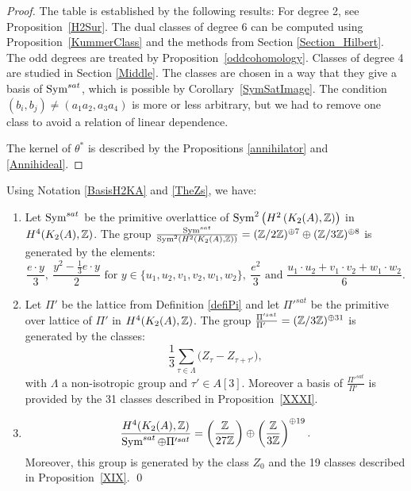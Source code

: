 \begin{proof}
The table is established by the following results:
For degree 2, see Proposition~\ref{H2Sur}. The dual classes of degree 6 can be computed using Proposition~\ref{KummerClass} and the methods from Section \ref{Section_Hilbert}.
The odd degrees are treated by Proposition~\ref{oddcohomology}. Classes of degree 4 are studied in Section \ref{Middle}. The classes are chosen in a way that they give a basis of $\operatorname{Sym}^{sat}$, which is possible by Corollary~\ref{SymSatImage}. The condition $(b_i,b_j)\neq(a_1a_2,a_3a_4)$ is more or less arbitrary, but we had to remove one class to avoid a relation of linear dependence.

The kernel of $\theta^*$ is described by the Propositions \ref{annihilator} and \ref{Annihideal}.
\end{proof}


\begin{thm}\label{integralbasistheorem}
Using Notation \ref{BasisH2KA} and \ref{TheZs}, we have:
\begin{enumerate}
\item
Let $\operatorname{Sym}^{sat}$ be the primitive overlattice of $\operatorname{Sym}^2\left(H^2\left(K_{ 2 }( A ),\mathbb{Z}\right)\right)$ in $H^4(K_2(A),\mathbb{Z})$.
The group $\frac{\operatorname{Sym}^{sat}}{\operatorname{Sym}^2\left(H^2\left(K_{ 2 }( A ),\mathbb{Z}\right)\right)}=(\mathbb{Z}/2\mathbb{Z})^{\oplus 7}\oplus(\mathbb{Z}/3\mathbb{Z})^{\oplus 8}$ is generated by the elements:
$$\frac{e \cdot y}{3},\ \frac{y^2 - \frac{1}{3} e\cdot y}{2} \text{ for } y\in\{u_1,u_2,v_1,v_2,w_1,w_2\},\ 
\frac{e^2}{3} \text{ and } \frac{u_{1}\cdot u_{2}+v_{1}\cdot v_{2}+w_{1}\cdot w_{2}}{6}.$$
\item
Let $\Pi'$ be the lattice from Definition \ref{defiPi} and let $\Pi'^{sat}$ be the primitive over lattice of $\Pi'$ in $H^4(K_2(A),\mathbb{Z})$.
The group $\frac{\Pi'^{sat}}{\Pi'\ \ \ }=(\mathbb{Z}/3\mathbb{Z})^{\oplus 31}$ is generated by the classes:
$$\frac{1}{3}\sum_{\tau\in\Lambda} \Big(Z_{\tau} - Z_{\tau+\tau'}\Big),
$$
with $\Lambda$ a non-isotropic group and $\tau'\in A[3]$. Moreover a basis of $\frac{\Pi'^{sat}}{\Pi'\ \ \ }$ is provided by the 31 classes described in Proposition~\ref{XXXI}. 
\item
$$
\frac{H^4(K_2(A),\mathbb{Z})}{\operatorname{Sym}^{sat}\oplus\Pi'^{sat}}=\left(\frac{\mathbb{Z}}{27\mathbb{Z}}\right)\oplus\left(\frac{\mathbb{Z}}{3\mathbb{Z}}\right)^{\oplus 19}.
$$
Moreover, this group is generated by the class $Z_0$ and the 19 classes described in Proposition~\ref{XIX}.
\qed
\end{enumerate}
\end{thm}


